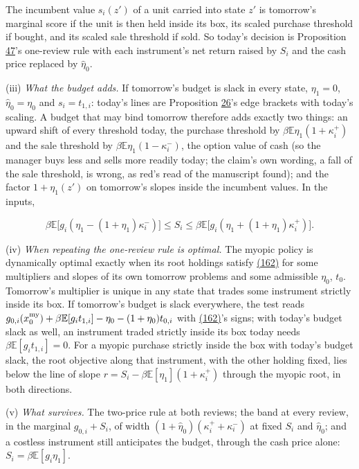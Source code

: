 \documentclass[11pt]{article}
\begin{document}
The incumbent value \(s_i(z')\) of a unit carried into state \(z'\) is
tomorrow's marginal score if the unit is then held inside its box, its
scaled purchase threshold if bought, and its scaled sale threshold if
sold. So today's decision is Proposition \hyperref[res:Proposition-47]{47}'s one-review rule with each
instrument's net return raised by \(S_i\) and the cash price replaced by
\(\hat\eta_0\).

(iii) \emph{What the budget adds.} If tomorrow's budget is slack in every
state, \(\eta_1=0\), \(\hat\eta_0=\eta_0\) and \(s_i=t_{1,i}\): today's lines are Proposition \hyperref[res:Proposition-26]{26}'s
edge brackets with today's scaling. A budget that may bind tomorrow
therefore adds exactly two things: an upward shift of every threshold
today, the purchase threshold by \(\beta\mathbb E\eta_1(1+\kappa^+_i)\) and the sale threshold
by \(\beta\mathbb E\eta_1(1-\kappa^-_i)\), the option value of cash (so the manager buys less
and sells more readily today; the claim's own wording, a fall of the
sale threshold, is wrong, as red's read of the manuscript found); and the factor \(1+\eta_1(z')\) on tomorrow's slopes inside the
incumbent values. In the inputs,

\begin{equation*}
\beta\mathbb E\bigl[g_i(\eta_1-(1+\eta_1)\kappa^-_i)\bigr]\leq S_i\leq\beta\mathbb E\bigl[g_i(\eta_1+(1+\eta_1)\kappa^+_i)\bigr].\tag{163}\label{eq:163}
\end{equation*}

(iv) \emph{When repeating the one-review rule is optimal.} The myopic policy
is dynamically optimal exactly when its root holdings satisfy \hyperref[eq:162]{(162)} for
some multipliers and slopes of its own tomorrow problems and some
admissible \(\eta_0\), \(t_0\). Tomorrow's multiplier is unique in any state that
trades some instrument strictly inside its box. If tomorrow's budget is
slack everywhere, the test reads
\(g_{0,i}(x^{\rm my}_0)+\beta\mathbb E[g_it_{1,i}]-\eta_0-(1+\eta_0)t_{0,i}\) with \hyperref[eq:162]{(162)}'s signs; with
today's budget slack as well, an instrument traded strictly inside its
box today needs \(\beta\mathbb E[g_it_{1,i}]=0\). For a myopic purchase strictly inside
the box with today's budget slack, the root objective along that
instrument, with the other holding fixed, lies below the line of slope
\(r=S_i-\beta\mathbb E[\eta_1](1+\kappa^+_i)\) through the myopic root, in both directions.

(v) \emph{What survives.} The two-price rule at both reviews; the band at
every review, in the marginal \(g_{0,i}+S_i\), of width \((1+\hat\eta_0)(\kappa^+_i+\kappa^-_i)\)
at fixed \(S_i\) and \(\hat\eta_0\); and a costless instrument still anticipates
the budget, through the cash price alone: \(S_i=\beta\mathbb E[g_i\eta_1]\).
\end{document}
